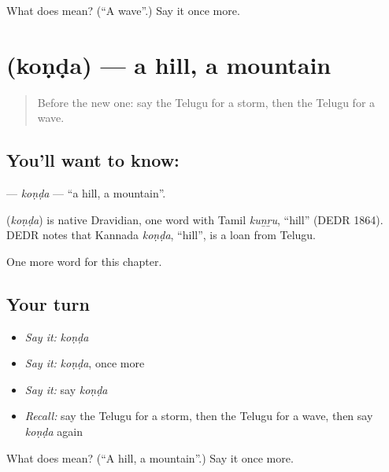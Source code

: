 \begin{tcolorbox}[breakable,colback=teal!4,colframe=teal!35!black,title={Before you move on}]
What does  mean? (\textquotedblleft{}A wave\textquotedblright{}.) Say it once more.
\end{tcolorbox}
\section[\texorpdfstring{\te{కొండ} (koṇḍa)}{కొండ (koṇḍa)}]{ (koṇḍa) — a hill, a mountain}

\label{lesson:TE-C121-konda}



\begin{quote}
Before the new one: say the Telugu for a storm, then the Telugu for a wave.
\end{quote}

\subsection*{You'll want to know: }
\textbf{} — \emph{koṇḍa} — \textquotedblleft{}a hill, a mountain\textquotedblright{}.

\begin{cousinweb}
\textbf{} (\emph{koṇḍa}) is native Dravidian, one word with Tamil \emph{kuṉṟu}, \textquotedblleft{}hill\textquotedblright{} (DEDR 1864). DEDR notes that Kannada \emph{koṇḍa}, \textquotedblleft{}hill\textquotedblright{}, is a loan from Telugu.
\end{cousinweb}

\begin{grammarlens}[title={What you've built}]
One more word for this chapter.
\end{grammarlens}

\subsection*{Your turn}
\begin{itemize}
\raggedright
  \item \emph{Say it:} \emph{koṇḍa}
  \item \emph{Say it:} \emph{koṇḍa}, once more
  \item \emph{Say it:} say \emph{koṇḍa}
  \item \emph{Recall:} say the Telugu for a storm, then the Telugu for a wave, then say \emph{koṇḍa} again
\end{itemize}

\begin{tcolorbox}[breakable,colback=teal!4,colframe=teal!35!black,title={Before you move on}]
What does  mean? (\textquotedblleft{}A hill, a mountain\textquotedblright{}.) Say it once more.
\end{tcolorbox}
